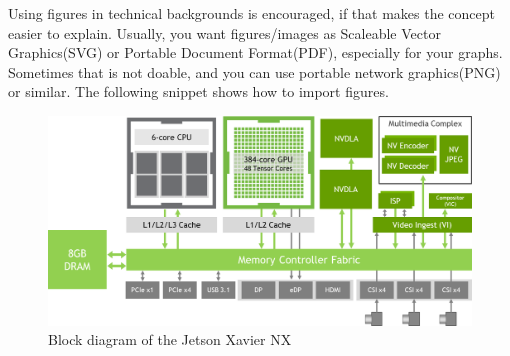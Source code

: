 \documentclass[conference]{IEEEtran}
\begin{document}
\bigskip

Using figures in technical backgrounds is encouraged, if that makes the concept easier to explain. Usually, you want figures/images as Scaleable Vector Graphics(SVG) or Portable Document Format(PDF), especially for your graphs. Sometimes that is not doable, and you can use portable network graphics(PNG) or similar.
The following snippet shows how to import figures.

\begin{figure}[htbp]
	\centering
	\includegraphics[scale=0.75]{figures/jetson_nx.png}
	\caption{Block diagram of the Jetson Xavier NX}
	\label{fig:block_diagram}
\end{figure}

% 	
\end{document}
